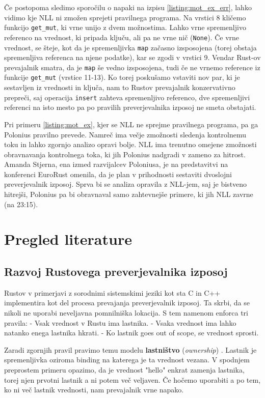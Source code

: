 \documentclass[a4paper,12pt,openright]{book}
\begin{document}
Če postopoma sledimo sporočilu o napaki na izpisu \ref{listing:mot_ex_err}, lahko vidimo kje NLL ni zmožen sprejeti pravilnega programa. Na vrstici 8 kličemo funkcijo \verb|get_mut|, ki vrne unijo z dvem možnostima. Lahko vrne spremenljivo referenco na vrednost, ki pripada ključu, ali pa ne vrne nič (\verb|None|). Če vrne vrednost, se šteje, kot da je spremenljivka \verb|map| začasno izsposojena (torej obstaja spremenljiva referenca na njene podatke), kar se zgodi v vrstici 9. Vendar Rust-ov prevajalnik smatra, da je \verb|map| še vedno izsposojena, tudi če ne vrnemo reference iz funkcije \verb|get_mut| (vrstice 11-13). Ko torej poskušamo vstaviti nov par, ki je sestavljen iz vrednosti in ključa, nam to Rustov prevajalnik konzervativno prepreči, saj operacija \verb|insert| zahteva spremenljivo referenco, dve spremenljivi referenci na isto mesto pa po pravilih preverjevalnika izposoj ne smeta obstajati.

Pri primeru \ref{listing:mot_ex}, kjer se NLL ne sprejme pravilnega programa, pa ga Polonius pravilno prevede. Namreč ima večje zmožnosti sledenja kontrolnemu toku in lahko zgornjo analizo opravi bolje. NLL ima trenutno omejene zmožnosti obravnavanja kontrolnega toka, ki jih Polonius nadgradi v zameno za hitrost. Amanda Stjerna, ena izmed razvijalcev Poloniusa, je na predstavitvi na konferenci EuroRust omenila, da je plan v prihodnosti sestaviti dvoslojni preverjevalnik izposoj. Sprva bi se analiza opravila z NLL-jem, saj je bistveno hitrejši, Polonius pa bi obravnaval samo zahtevnejše primere, ki jih NLL zavrne \cite{eurorustFirstSixYears2024} (na 23:15).

\chapter{Pregled literature}

\section{Razvoj Rustovega preverjevalnika izposoj}
Rustov v primerjavi z sorodnimi sistemskimi jeziki kot sta C in C++ implementira kot del procesa prevajanja
preverjevalnik izposoj. Ta skrbi, da se nikoli ne uporabi neveljavna pomnilniška lokacija. S tem namenom
enforca tri pravila:
- Vsak vrednost v Rustu ima lastnika.
- Vsaka vrednost ima lahko natanko enega lastnika hkrati.
- Ko lastnik goes out of scope, se vrednost sprosti.

Zaradi zgornjih pravil pravimo temu modelu \textbf{lastništvo} (\textit{ownership}) \cite{klabnikRustProgrammingLanguage2023}.
Lastnik je spremenljivka oziroma binding na katerega je ta vrednost vezana. V spodnjem preprostem
primeru opazimo, da je vrednost "hello" enkrat zamenja lastnika, torej njen prvotni lastnik a ni
potem več veljaven. Če hočemo uporabiti a po tem, ko ni več lastnik vrednosti, nam prevajalnik vrne napako.
\end{document}
